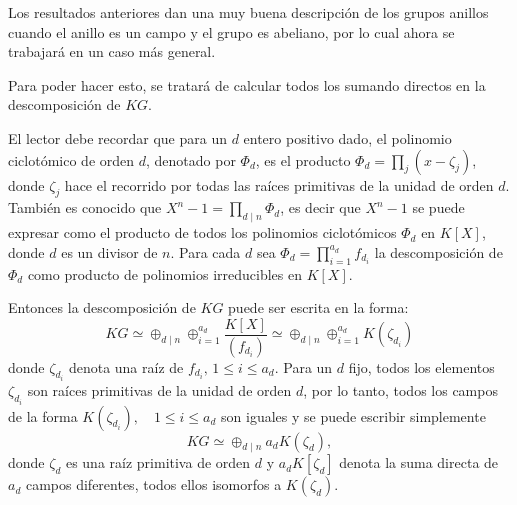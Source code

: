 Los resultados anteriores dan una muy buena descripción de los grupos anillos cuando el anillo es un campo y el grupo es abeliano, por lo cual ahora se trabajará en un caso más general. 


Para poder hacer esto, se tratará de calcular todos los sumando directos en la descomposición de $KG$.  

El lector debe recordar que para un $d$ entero positivo dado, el polinomio ciclotómico de orden $d$, denotado por $\Phi_d$, es el producto $\Phi_d = \prod_{j}(x-\zeta_j)$, donde $\zeta_j$ hace el recorrido por todas las raíces primitivas de la unidad de orden $d$. También es conocido que $X^n -1 = \prod_{d\mid n} \Phi_d $, es decir que $X^n -1 $ se puede expresar como el producto de todos los polinomios ciclotómicos $\Phi_d$ en $K[X]$, donde $d$ es un divisor de $n$. Para cada $d$ sea $\Phi_d = \prod_{i=1}^{a_d}f_{d_i}$ la descomposición de $\Phi_d$ como producto de polinomios irreducibles en $K[X]$.

Entonces la descomposición de $KG$ puede ser escrita en la forma:
\[ KG \simeq \oplus_{d \mid n} \oplus_{i=1}^{a_d} \frac{K[X]}{(f_{d_i})} \simeq \oplus_{d \mid n} \oplus_{i=1}^{a_d} K(\zeta _{d_i}) \]
donde $\zeta_{d_i}$ denota una raíz de $f_{d_i}  \mbox{, } 1 \leq i \leq a_d $. Para un $d$ fijo, todos los elementos $\zeta_{d_i}$ son raíces primitivas de la unidad de orden $d$, por lo tanto, todos los campos de la forma $K(\zeta_{d_i}), \quad 1\leq i \leq a_d$ son iguales y se puede escribir simplemente 
\[ KG \simeq \oplus_{d \mid n} a_dK(\zeta_d),\]
donde $\zeta_d$ es una raíz primitiva de orden $d$ y $a_dK[\zeta_d]$ denota la suma directa de $a_d$ campos diferentes, todos ellos isomorfos a $K(\zeta_d)$.

